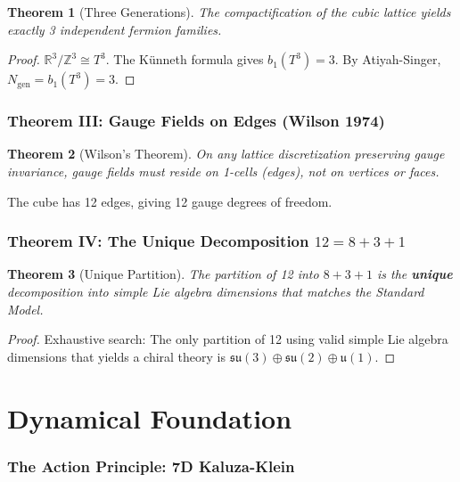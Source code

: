 \documentclass[11pt,a4paper]{article}
\theoremstyle{plain}
\newtheorem{theorem}{Theorem}[section]
\theoremstyle{definition}
\theoremstyle{remark}
\newcommand{\Ngen}{N_{\text{gen}}}
\begin{document}
\begin{theorem}[Three Generations]
The compactification of the cubic lattice yields exactly 3 independent fermion families.
\end{theorem}

\begin{proof}
$\mathbb{R}^3/\mathbb{Z}^3 \cong T^3$. The K\"unneth formula gives $b_1(T^3) = 3$. By Atiyah-Singer, $\Ngen = b_1(T^3) = 3$.
\end{proof}

\section{Theorem III: Gauge Fields on Edges (Wilson 1974)}

\begin{theorem}[Wilson's Theorem]
On any lattice discretization preserving gauge invariance, gauge fields must reside on 1-cells (edges), not on vertices or faces.
\end{theorem}

The cube has 12 edges, giving 12 gauge degrees of freedom.

\section{Theorem IV: The Unique Decomposition $12 = 8 + 3 + 1$}

\begin{theorem}[Unique Partition]
The partition of 12 into $8 + 3 + 1$ is the \textbf{unique} decomposition into simple Lie algebra dimensions that matches the Standard Model.
\end{theorem}

\begin{proof}
Exhaustive search: The only partition of 12 using valid simple Lie algebra dimensions that yields a chiral theory is $\mathfrak{su}(3) \oplus \mathfrak{su}(2) \oplus \mathfrak{u}(1)$.
\end{proof}

\part{Dynamical Foundation}

\section{The Action Principle: 7D Kaluza-Klein}
\end{document}
